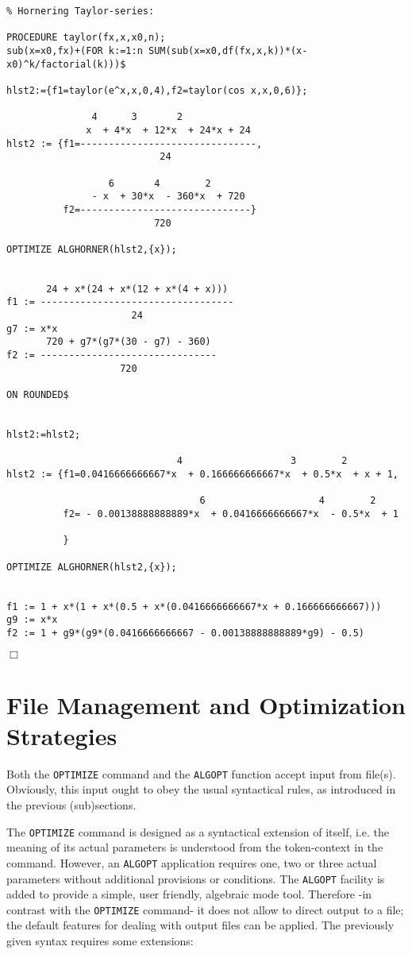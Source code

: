 {\small
\begin{verbatim}
% Hornering Taylor-series:

PROCEDURE taylor(fx,x,x0,n);
sub(x=x0,fx)+(FOR k:=1:n SUM(sub(x=x0,df(fx,x,k))*(x-x0)^k/factorial(k)))$

hlst2:={f1=taylor(e^x,x,0,4),f2=taylor(cos x,x,0,6)};

               4      3       2
              x  + 4*x  + 12*x  + 24*x + 24
hlst2 := {f1=-------------------------------,
                           24

                  6       4        2
               - x  + 30*x  - 360*x  + 720
          f2=------------------------------}
                          720

OPTIMIZE ALGHORNER(hlst2,{x});


       24 + x*(24 + x*(12 + x*(4 + x)))
f1 := ----------------------------------
                      24
g7 := x*x
       720 + g7*(g7*(30 - g7) - 360)
f2 := -------------------------------
                    720

ON ROUNDED$


hlst2:=hlst2;

                              4                   3        2
hlst2 := {f1=0.0416666666667*x  + 0.166666666667*x  + 0.5*x  + x + 1,

                                  6                    4        2
          f2= - 0.00138888888889*x  + 0.0416666666667*x  - 0.5*x  + 1

          }

OPTIMIZE ALGHORNER(hlst2,{x});


f1 := 1 + x*(1 + x*(0.5 + x*(0.0416666666667*x + 0.166666666667)))
g9 := x*x
f2 := 1 + g9*(g9*(0.0416666666667 - 0.00138888888889*g9) - 0.5)
\end{verbatim}
\begin{flushright}
$\Box$
\end{flushright}}

\newpage
\section{File Management and Optimization Strategies}\label{SCOPE:files}

Both the {\tt OPTIMIZE} command and the {\tt ALGOPT} function accept
input from file(s). Obviously, this input ought to obey the
usual syntactical rules, as introduced in the previous (sub)sections.

The {\tt OPTIMIZE} command is designed as a syntactical extension of {\REDUCE}
itself, i.e. the meaning of its actual parameters is understood from the
token-context in the command. However, an {\tt ALGOPT}
application requires one, two or three actual parameters without additional
provisions or conditions.
The {\tt ALGOPT} facility is added to provide a simple, user friendly, 
algebraic mode tool. Therefore -in contrast with the {\tt OPTIMIZE} command- 
it does not allow to direct output to a file; the default {\REDUCE} features
for dealing with output files can be applied.
The previously given syntax requires some extensions:

